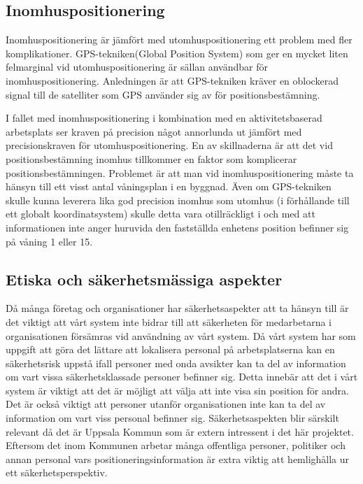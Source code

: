 \documentclass[swedish, a4paper,12pt]{article}
\begin{document}
	\subsection{Inomhuspositionering}
    Inomhuspositionering är jämfört med utomhuspositionering ett problem med fler komplikationer. GPS-tekniken(Global Position System) som ger en mycket liten felmarginal vid utomhuspositionering är sällan användbar för inomhuspositionering. Anledningen är att GPS-tekniken kräver en oblockerad signal till de satelliter som GPS använder sig av för positionsbestämning. \cite{GPS_US_ACCURACY}

    I fallet med inomhuspositionering i kombination med en aktivitetsbaserad arbetsplats ser kraven på precision något annorlunda ut jämfört med precisionskraven för utomhuspositionering. En av skillnaderna är att det vid positionsbestämning inomhus tillkommer en faktor som komplicerar positionsbestämningen. Problemet är att man vid inomhuspositionering måste ta hänsyn till ett visst antal våningsplan i en byggnad. Även om GPS-tekniken skulle kunna leverera lika god precision inomhus som utomhus (i förhållande till ett globalt koordinatsystem) skulle detta vara otillräckligt i och med att informationen inte anger huruvida den fastställda enhetens position befinner sig på våning 1 eller 15.

		\subsection{Etiska och säkerhetsmässiga aspekter}
		Då många företag och organisationer har säkerhetsaspekter att ta hänsyn till är det viktigt att vårt system inte bidrar till att säkerheten för medarbetarna i organisationen försämras vid användning av vårt system.
		Då vårt system har som uppgift att göra det lättare att lokalisera personal på arbetsplatserna kan en säkerhetsrisk uppstå ifall personer med onda avsikter kan ta del av information om vart vissa säkerhetsklassade personer befinner sig. Detta innebär att det i vårt system är viktigt att det är möjligt att välja att inte visa sin position för andra. Det är också viktigt att personer utanför organisationen inte kan ta del av information om vart viss personal befinner sig.
		Säkerhetsaspekten blir särskilt relevant då det är Uppsala Kommun som är extern intressent i det här projektet. Eftersom det inom Kommunen arbetar många offentliga personer, politiker och annan personal vars positioneringsinformation är extra viktig att hemlighålla ur ett säkerhetsperspektiv.
\end{document}

